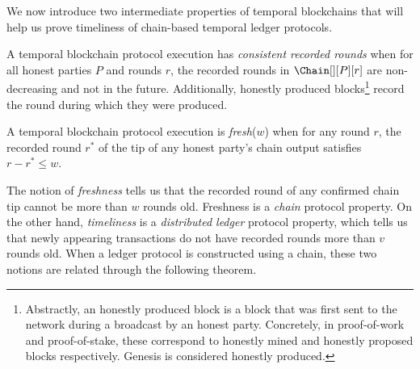 We now introduce two intermediate properties of temporal blockchains
that will help us prove timeliness of
chain-based temporal ledger protocols.

\begin{definition}
  A temporal blockchain protocol execution has \emph{consistent recorded rounds}
  when for all honest parties $P$ and rounds $r$,
  the recorded rounds in $\Chain[][P][r]$ are non-decreasing and not
  in the future.
  Additionally, honestly produced blocks\footnote{
    Abstractly, an honestly produced block is a block that was first
    sent to the network during a broadcast by an honest party. Concretely, in proof-of-work
    and proof-of-stake, these correspond to honestly mined and honestly
    proposed blocks respectively. Genesis is considered honestly produced.
  } record the round during which
  they were produced.
\end{definition}

\begin{definition}[Freshness] \label{def:tip-freshness}
  A temporal blockchain protocol execution is \emph{fresh}($w$) when for
  any round $r$, the recorded round
  $r^*$ of the tip of any honest party's chain output
  satisfies $r - r^* \leq w$.
\end{definition}

The notion of \emph{freshness} tells us that the recorded round
of any confirmed chain tip cannot be more than $w$ rounds old.
Freshness is a \emph{chain} protocol property.
On the other hand, \emph{timeliness} is a \emph{distributed ledger} protocol property,
which tells us that newly appearing transactions
do not have recorded rounds more than $v$ rounds old.
When a ledger protocol is constructed using a chain,
these two notions are related through the following theorem.

